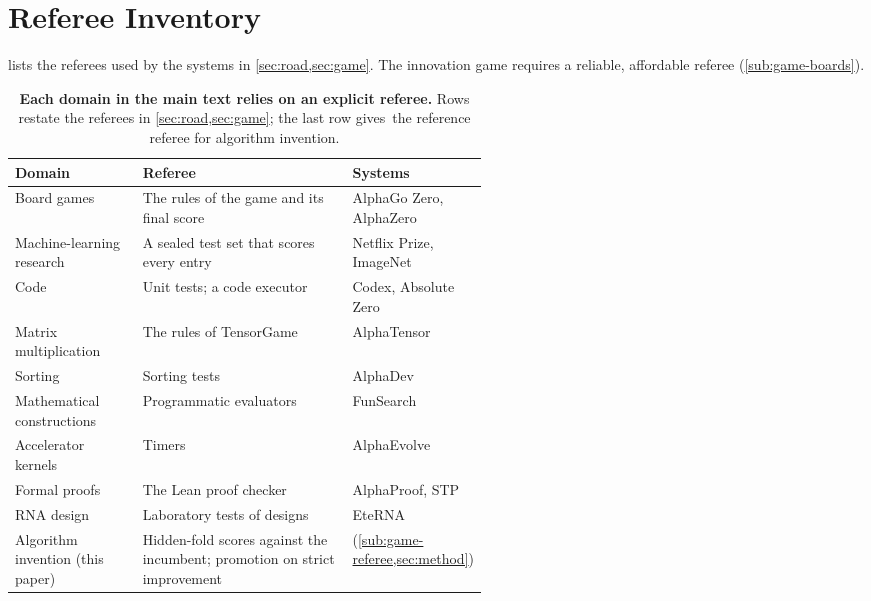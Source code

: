 \section{Referee Inventory}\label{app:history}

 lists the referees used by the systems in
\cref{sec:road,sec:game}. The innovation game requires a reliable,
affordable referee (\cref{sub:game-boards}).





\begin{table}[htb]
  \caption{\textbf{Each domain in the main text relies on an explicit referee.}
  Rows restate the referees in \cref{sec:road,sec:game}; the last row
  \mbox{gives the} reference referee for algorithm invention.}
  \label{tab:referees}
  \centering
  \small
  \setlength{\tabcolsep}{4pt}
  \setlength{\extrarowheight}{0pt}%
  \begin{tabularx}{\linewidth}{@{}>{\raggedright\arraybackslash}p{0.27\linewidth}>{\raggedright\arraybackslash}X>{\raggedright\arraybackslash}p{0.28\linewidth}@{}}
    \toprule
    Domain & Referee & Systems \\
    \midrule
    Board games & The rules of the game and its final score & AlphaGo Zero, AlphaZero \citep{silver2017mastering,silver2018general} \\
    Machine-learning research & A sealed test set that scores every entry & Netflix Prize, ImageNet \citep{donoho2017fifty,bennett2007netflix,russakovsky2015imagenet} \\
    Code & Unit tests; a code executor & Codex, Absolute Zero \citep{chen2021codex,zhao2025absolutezero} \\
    Matrix multiplication & The rules of TensorGame & AlphaTensor \citep{fawzi2022alphatensor} \\
    Sorting & Sorting tests & AlphaDev \citep{mankowitz2023alphadev} \\
    Mathematical constructions & Programmatic evaluators & FunSearch \citep{romeraparedes2024funsearch} \\
    Accelerator kernels & Timers & AlphaEvolve \citep{novikov2025alphaevolve} \\
    Formal proofs & The Lean proof checker & AlphaProof, STP \citep{hubert2026alphaproof,dong2025stp} \\
    RNA design & Laboratory tests of designs & EteRNA \citep{lee2014eterna} \\
    \midrule
    Algorithm invention (this paper) & Hidden-fold scores against the incumbent; promotion on strict improvement & \EZ{} (\cref{sub:game-referee,sec:method}) \\
    \bottomrule
  \end{tabularx}
\end{table}

